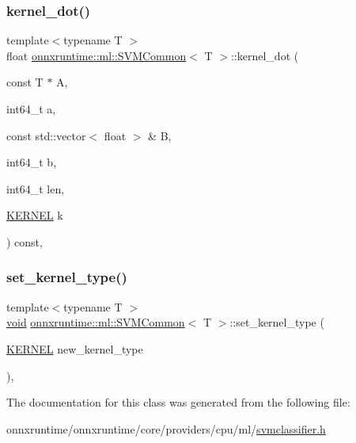 \subsubsection{\texorpdfstring{kernel\+\_\+dot()}{kernel\_dot()}}
{\footnotesize\ttfamily template$<$typename T $>$ \\
float \mbox{\hyperlink{classonnxruntime_1_1ml_1_1SVMCommon}{onnxruntime\+::ml\+::\+S\+V\+M\+Common}}$<$ T $>$\+::kernel\+\_\+dot (\begin{DoxyParamCaption}\item[{const T $\ast$}]{A,  }\item[{int64\+\_\+t}]{a,  }\item[{const std\+::vector$<$ float $>$ \&}]{B,  }\item[{int64\+\_\+t}]{b,  }\item[{int64\+\_\+t}]{len,  }\item[{\mbox{\hyperlink{namespaceonnxruntime_1_1ml_a3b945a42c5d7da1297e6b831fe7ae807}{K\+E\+R\+N\+EL}}}]{k }\end{DoxyParamCaption}) const\hspace{0.3cm}{\ttfamily [inline]}, {\ttfamily [protected]}}

\mbox{\label{classonnxruntime_1_1ml_1_1SVMCommon_a06ce69d078cd9ecd44cb31cdd3109a7e}} 
\subsubsection{\texorpdfstring{set\+\_\+kernel\+\_\+type()}{set\_kernel\_type()}}
{\footnotesize\ttfamily template$<$typename T $>$ \\
\mbox{\hyperlink{mlasi_8h_a88f941d423cb2a819b70a1358982b1a6}{void}} \mbox{\hyperlink{classonnxruntime_1_1ml_1_1SVMCommon}{onnxruntime\+::ml\+::\+S\+V\+M\+Common}}$<$ T $>$\+::set\+\_\+kernel\+\_\+type (\begin{DoxyParamCaption}\item[{\mbox{\hyperlink{namespaceonnxruntime_1_1ml_a3b945a42c5d7da1297e6b831fe7ae807}{K\+E\+R\+N\+EL}}}]{new\+\_\+kernel\+\_\+type }\end{DoxyParamCaption})\hspace{0.3cm}{\ttfamily [inline]}, {\ttfamily [protected]}}



The documentation for this class was generated from the following file\+:\begin{DoxyCompactItemize}
\item 
onnxruntime/onnxruntime/core/providers/cpu/ml/\mbox{\hyperlink{svmclassifier_8h}{svmclassifier.\+h}}\end{DoxyCompactItemize}
